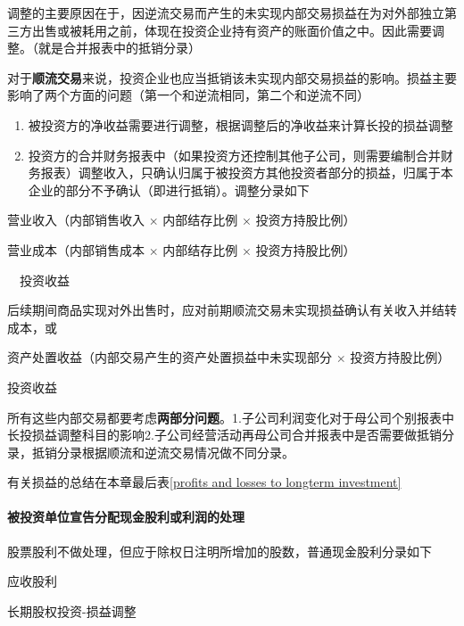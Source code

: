 \documentclass[UTF8,12pt]{ctexart}
\newenvironment{Dr}{%
	\begin{list}{}%
		{
			\setlength{\leftmargin}{2em}
			\setlength{\labelwidth}{2em}
			\setlength{\labelsep}{0pt}
			\setlength{\itemindent}{0pt}
			\setlength{\listparindent}{0pt}
			\setlength{\parsep}{0pt}
			\setlength{\topsep}{0pt}
		}
		\item[\textbf{借：}]
	}{%
	\end{list}
}
\newenvironment{Cr}{%
	\begin{list}{}%
		{
			\setlength{\leftmargin}{2em}
			\setlength{\labelwidth}{2em}
			\setlength{\labelsep}{0pt}
			\setlength{\itemindent}{0pt}
			\setlength{\listparindent}{0pt}
			\setlength{\parsep}{0pt}
			\setlength{\topsep}{0pt}
		}
		\item[\textbf{贷：}]
	}{%
	\end{list}
}
\numberwithin{equation}{section} %
\numberwithin{figure}{section}
\numberwithin{table}{section}
\begin{document}
	调整的主要原因在于，因逆流交易而产生的未实现内部交易损益在为对外部独立第三方出售或被耗用之前，体现在投资企业持有资产的账面价值之中。因此需要调整。（就是合并报表中的抵销分录）
	
	对于\textbf{顺流交易}来说，投资企业也应当抵销该未实现内部交易损益的影响。损益主要影响了两个方面的问题（第一个和逆流相同，第二个和逆流不同）
	\begin{enumerate}
		\item 被投资方的净收益需要进行调整，根据调整后的净收益来计算长投的损益调整
		
		\item 投资方的合并财务报表中（如果投资方还控制其他子公司，则需要编制合并财务报表）调整收入，只确认归属于被投资方其他投资者部分的损益，归属于本企业的部分不予确认（即进行抵销）。调整分录如下
	\end{enumerate}
	
	\begin{Dr}
		营业收入（内部销售收入 $\times$ 内部结存比例 $\times$ 投资方持股比例）
	\end{Dr}
	\begin{Cr}
		营业成本（内部销售成本 $\times$ 内部结存比例 $\times$ 投资方持股比例）
		
		\ \ 投资收益
	\end{Cr}
	
	后续期间商品实现对外出售时，应对前期顺流交易未实现损益确认有关收入并结转成本，或
	
	\begin{Dr}
		资产处置收益（内部交易产生的资产处置损益中未实现部分 $\times$ 投资方持股比例）
	\end{Dr}
	\begin{Cr}
		投资收益 
	\end{Cr}
	
	
	所有这些内部交易都要考虑\textbf{两部分问题}。1.子公司利润变化对于母公司个别报表中长投损益调整科目的影响2.子公司经营活动再母公司合并报表中是否需要做抵销分录，抵销分录根据顺流和逆流交易情况做不同分录。
	
	有关损益的总结在本章最后表\ref{profits and losses to longterm investment}
	
	
	
	
	\paragraph{被投资单位宣告分配现金股利或利润的处理}股票股利不做处理，但应于除权日注明所增加的股数，普通现金股利分录如下
	
	\begin{Dr}
		应收股利
	\end{Dr}
	\begin{Cr}
		长期股权投资-损益调整
	\end{Cr}
	
\end{document}
